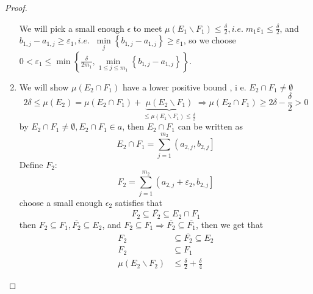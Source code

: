 \begin{proof}
\begin{enumerate}
		 We will pick a small enough $ \epsilon $ to meet $\mu \left( {{E_1}\backslash {F_1}} \right) \leqslant \frac{\delta }{2},i.e.\;{m_1}{\varepsilon _1} \leqslant \frac{\delta }{2}$, and ${b_{1,j}} - {a_{1,j}} \geqslant {\varepsilon _1},i.e.\;\;\mathop {\min }\limits_j \left\{ {{b_{1,j}} - {a_{1,j}}} \right\} \geqslant {\varepsilon _1}$, so we choose $0 < {\varepsilon _1} \leqslant \min \left\{ {\frac{\delta }{{2{m_1}}},\mathop {\min }\limits_{1 \leqslant j \leqslant {m_1}} \left\{ {{b_{1,j}} - {a_{1,j}}} \right\}} \right\}$.
		\item  We will show  $\mu \left( {{E_2} \cap {F_1}} \right)$ have a lower positive bound , i e. ${E_2} \cap {F_1} \ne \emptyset $
		\begin{equation}
		2\delta  \leqslant \mu \left( {{E_2}} \right) = \mu \left( {{E_2} \cap {F_1}} \right) + \underbrace {\mu \left( {{E_2}\backslash {F_1}} \right)}_{ \leqslant \mu \left( {{E_1}\backslash {F_1}} \right) \leqslant \frac{\delta }{2}} \Rightarrow \mu \left( {{E_2} \cap {F_1}} \right) \geqslant 2\delta  - \frac{\delta }{2} > 0
		\label{eq7.7}
		\end{equation}
		by ${E_2} \cap {F_1} \ne \emptyset ,{E_2} \cap {F_1} \in a$, then $ {E_2} \cap {F_1} $ can be written as
		\begin{equation}
		{E_2} \cap {F_1} = \sum\limits_{j = 1}^{{m_2}} {\left( {{a_{2,j}},{b_{2,j}}} \right]} 
		\label{eq7.8}
		\end{equation}
		Define $ F_{2}: $
		\begin{equation}
		{F_2} = \sum\limits_{j = 1}^{{m_2}} {\left( {{a_{2,j}} + {\varepsilon _2},{b_{2,j}}} \right]} 
		\label{eq7.9}
		\end{equation}
		choose a small enough $ \epsilon_{2} $ satisfies that
		\begin{equation}
		{F_2} \subseteq \overline {{F_2}}  \subseteq {E_2} \cap {F_1}
		\label{eq7.10}
		\end{equation}
		then ${F_2} \subseteq {F_1},\overline {{F_2}}  \subseteq {E_2}$, and ${F_2} \subseteq {F_1} \Rightarrow \overline {{F_2}}  \subseteq \overline {{F_1}} $, then we get that
		\begin{equation}
		\begin{split}
		{F_2} & \subseteq \overline {{F_2}}  \subseteq {E_2}\\
		{F_2} & \subseteq {F_1}\\
		\mu \left( {{E_2}\backslash {F_2}} \right) & \leqslant \frac{\delta }{2} + \frac{\delta }{4}
		\end{split}
		\label{eq7.11}

\end{equation}
\end{enumerate}
\end{proof}
